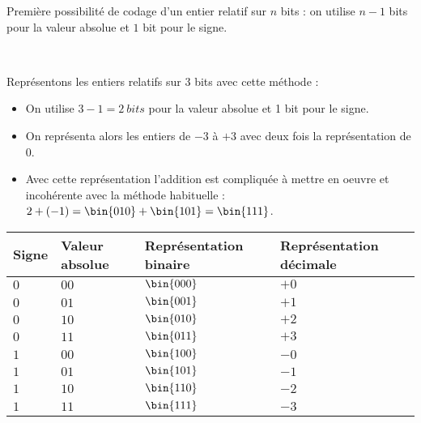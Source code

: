 Première possibilité de codage d'un entier relatif sur $n$ bits : on utilise $n-1$ bits pour la valeur absolue et
$1$ bit pour le signe.
\begin{exemple} ~\\

\begin{minipage}{0.45\textwidth}
Représentons les entiers relatifs sur 3 bits avec cette méthode :
\begin{itemize}
\item On utilise $3-1=\SI{2}{bits}$ pour la valeur absolue et 1 bit pour le signe.
\item On représenta alors les entiers de $-3$ à $+3$ avec deux fois la représentation de 0.
\item Avec cette représentation l'addition est compliquée à mettre en oeuvre et incohérente avec la méthode habituelle :  $2+(-1)=\bin{010}+\bin{101}=\bin{111}$.
\end{itemize} 
\end{minipage}
\begin{minipage}{0.45\textwidth}
\begin{tabular}{|p{}|p{}|p{}|p{}|}
\hline 
Signe & Valeur absolue & Représentation binaire & Représentation décimale \\ 
\hline 
$0$ & $00$ & $\bin{000}$ & $+0$ \\ 
$0$ & $01$ & $\bin{001}$ & $+1$ \\ 
$0$ & $10$ & $\bin{010}$ & $+2$ \\ 
$0$ & $11$ & $\bin{011}$ & $+3$ \\ 
$1$ & $00$ & $\bin{100}$ & $-0$ \\ 
$1$ & $01$ & $\bin{101}$ & $-1$ \\ 
$1$ & $10$ & $\bin{110}$ & $-2$ \\ 
$1$ & $11$ & $\bin{111}$ & $-3$ \\ 
\hline 
\end{tabular} 
\end{minipage}

\end{exemple}


